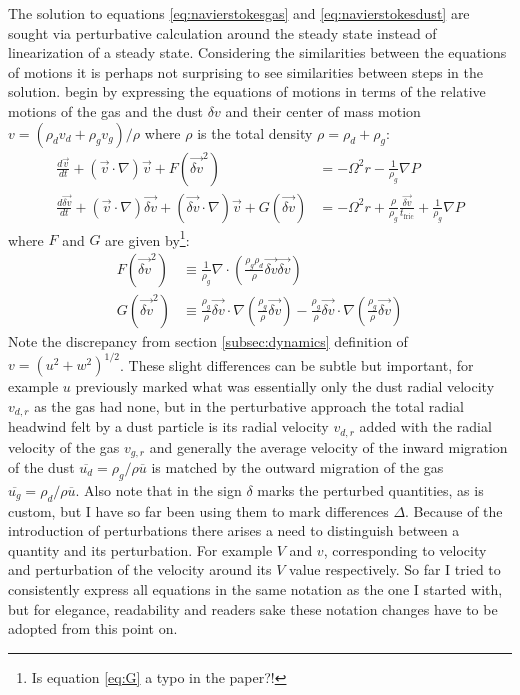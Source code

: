\documentclass[12pt]{article}
\begin{document}
The solution to equations \ref{eq:navierstokesgas} and \ref{eq:navierstokesdust} are sought via perturbative calculation around the steady state instead of linearization of a steady state. Considering the similarities between the equations of motions it is perhaps not surprising to see similarities between steps in the solution. \cite{Youdin05} begin by expressing the equations of motions in terms of the relative motions of the gas and the dust $\delta v$ and their center of mass motion $v = (\rho_dv_d+\rho_gv_g)/\rho$ where $\rho$ is the total density $\rho = \rho_d+\rho_g$:
\begin{align}
    \label{eq:comnavierstokesgas}
    \frac{d \vec{v}}{dt} + (\vec{v}\cdot \nabla)\vec{v} + F(\vec{\delta v}^2) 
    &= -\Omega^2r - \frac{1}{\rho_g } \nabla P \\
    \label{eq:comnavierstokesdust}
    \frac{d \vec{\delta v}}{dt} + (\vec{v}\cdot \nabla)\vec{\delta v} + (\vec{\delta v}\cdot \nabla)\vec{v} + G(\vec{\delta v})
    &= -\Omega^2r + \frac{\rho}{\rho_g}\frac{\vec{\delta v}}{t_\mathrm{fric}} + \frac{1}{\rho_g } \nabla P
\end{align}
where $F$ and $G$ are given by\footnote{Is equation \ref{eq:G} a typo in the paper?!}:
\begin{align}
    \label{eq:F}
     F(\vec{\delta v}^2) &\equiv \frac{1}{\rho_g } \nabla \cdot \left( \frac{\rho_g\rho_d}{\rho} \vec{\delta v} \vec{\delta v} \right) \\
    \label{eq:G}
     G(\vec{\delta v}^2) &\equiv \frac{\rho_g}{\rho}\vec{\delta v} \cdot \nabla\left( \frac{\rho_g}{\rho}\vec{\delta v} \right) - \frac{\rho_g}{\rho}\vec{\delta v} \cdot \nabla\left( \frac{\rho_g}{\rho}\vec{\delta v} \right) 
\end{align}
Note the discrepancy from section \ref{subsec:dynamics} definition of $v=(u^2+w^2)^{1/2}$. These slight differences can be subtle but important, for example $u$ previously marked what was essentially only the dust radial velocity $v_{d,r}$ as the gas had none, but in the perturbative approach the total radial headwind felt by a dust particle is its radial velocity $v_{d,r}$ added with the radial velocity of the gas $v_{g,r}$ and generally the average velocity of the inward migration of the dust $\overline{u_d}=\rho_g/\rho \overline{u}$ is matched by the outward migration of the gas $\overline{u_g}=\rho_d/\rho \overline{u}$. 
Also note that in \cite{Youdin05} the sign $\delta$ marks the perturbed quantities, as is custom, but I have so far been using them to mark differences $\Delta$. Because of the introduction of perturbations there arises a need to distinguish between a quantity and its perturbation. For example $V$ and $v$, corresponding to velocity and perturbation of the velocity around its $V$ value respectively. So far I tried to consistently express all equations in the same notation as the one I started with, but for elegance, readability and readers sake these notation changes have to be adopted from this point on.
\end{document}
